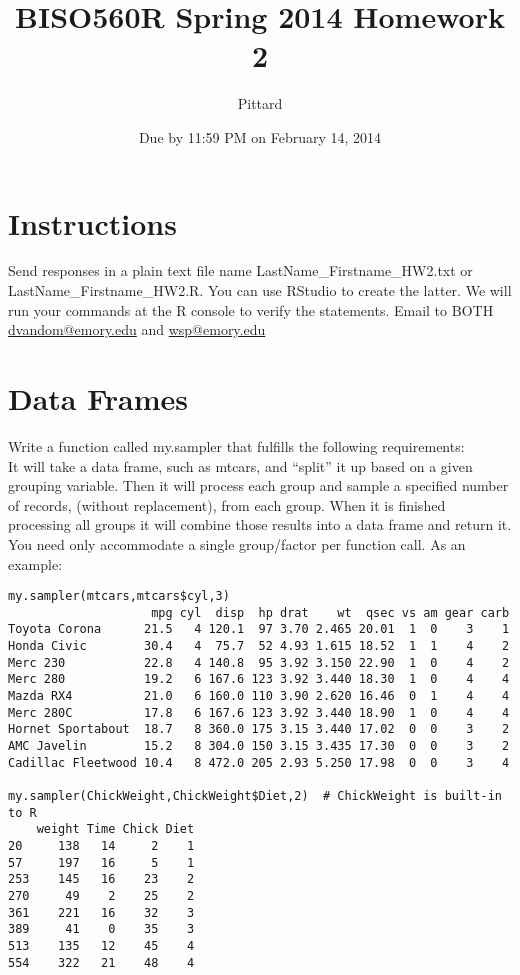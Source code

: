 \documentclass{article}
\begin{document}

\title{BISO560R Spring 2014 Homework 2}
\author{Pittard}
\date{Due by 11:59 PM on February 14, 2014}
\maketitle


\section*{Instructions}
Send responses in a plain text file name LastName\_Firstname\_HW2.txt or LastName\_Firstname\_HW2.R. You can use RStudio to create the latter. We will run your commands at the R console to verify the statements. Email to BOTH \url{dvandom@emory.edu} and \url{wsp@emory.edu}

\section{Data Frames}Write a function called my.sampler that fulfills the following requirements:
\\
It will take a data frame, such as mtcars, and ``split'' it up based on a given grouping variable. Then it will process each group and sample a specified number of records, (without replacement), from each group. When it is finished processing all groups it will combine those results into a data frame and return it. You need only accommodate a single group/factor per function call. As an example:

\begin{verbatim}
my.sampler(mtcars,mtcars$cyl,3)
                    mpg cyl  disp  hp drat    wt  qsec vs am gear carb
Toyota Corona      21.5   4 120.1  97 3.70 2.465 20.01  1  0    3    1
Honda Civic        30.4   4  75.7  52 4.93 1.615 18.52  1  1    4    2
Merc 230           22.8   4 140.8  95 3.92 3.150 22.90  1  0    4    2
Merc 280           19.2   6 167.6 123 3.92 3.440 18.30  1  0    4    4
Mazda RX4          21.0   6 160.0 110 3.90 2.620 16.46  0  1    4    4
Merc 280C          17.8   6 167.6 123 3.92 3.440 18.90  1  0    4    4
Hornet Sportabout  18.7   8 360.0 175 3.15 3.440 17.02  0  0    3    2
AMC Javelin        15.2   8 304.0 150 3.15 3.435 17.30  0  0    3    2
Cadillac Fleetwood 10.4   8 472.0 205 2.93 5.250 17.98  0  0    3    4

my.sampler(ChickWeight,ChickWeight$Diet,2)  # ChickWeight is built-in to R
    weight Time Chick Diet
20     138   14     2    1
57     197   16     5    1
253    145   16    23    2
270     49    2    25    2
361    221   16    32    3
389     41    0    35    3
513    135   12    45    4
554    322   21    48    4
\end{verbatim}
\end{document}
